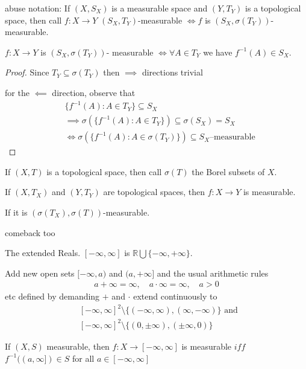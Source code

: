 abuse notation:
If $(X, S_X)$ is a measurable space and  $(Y, T_Y)$ is a topological space, then call $f : X \to Y$
$(S_X, T_Y)$-measurable $\iff f$ is $(S_X, \sigma(T_Y))$- measurable.

\begin{theorem}
	$f : X \to Y$ is $(S_X, \sigma(T_Y))$- measurable $\iff \forall A \in T_Y$ we have $f^{-1}(A) \in S_X$.
\end{theorem}

\begin{proof}
	Since $T_Y \subseteq \sigma(T_Y)$ 
	then $\implies$ directions trivial 

	for the $\impliedby$ direction, observe that 
	\begin{align*}
		&\{f^{-1}(A) : A \in T_Y\} \subseteq S_X \\
		&\implies \sigma(\{f^{-1}(A) : A \in T_Y\}) \subseteq \sigma(S_X) = S_X \\
		&\iff \sigma(\{f^{-1}(A) : A \in \sigma(T_Y)\}) \subseteq  S_X \text{--measurable}
	\end{align*}
\end{proof}

If $(X,T)$ is a topological space, then call $\sigma(T)$ the Borel subsets of  $X.$ 

If $(X, T_X)$ and $(Y,T_Y)$ are topological spaces, then $f:X \to Y$ is measurable.

If it is  $(\sigma(T_X), \sigma(T))$-measurable.

comeback too

\begin{definition}
	The extended Reals.
	$[-\infty,\infty]$ is $\mathbb{R} \bigcup \{-\infty, +\infty\}$.

	Add new open sets $[-\infty, a)$ and $(a, +\infty]$ 
	and the usual arithmetic rules
	\begin{align*}
		a + \infty = \infty, \quad a\cdot \infty = \infty, \quad a > 0
	\end{align*} etc defined by demanding $+$ and $\cdot$ extend continuously to
	\begin{align*}
		&[-\infty, \infty]^2 \setminus \{(-\infty, \infty), (\infty, -\infty)\} \text{ and } \\
		&[-\infty, \infty]^2 \setminus \{(0, \pm \infty), (\pm \infty, 0)\}
	\end{align*}
\end{definition}

\begin{corollary}
	If $(X,S)$ measurable, then $f : X \to [-\infty, \infty]$ is measurable 
	$iff$ $f^{-1}((a,\infty]) \in S$ for all $a \in [-\infty,\infty]$
\end{corollary}

